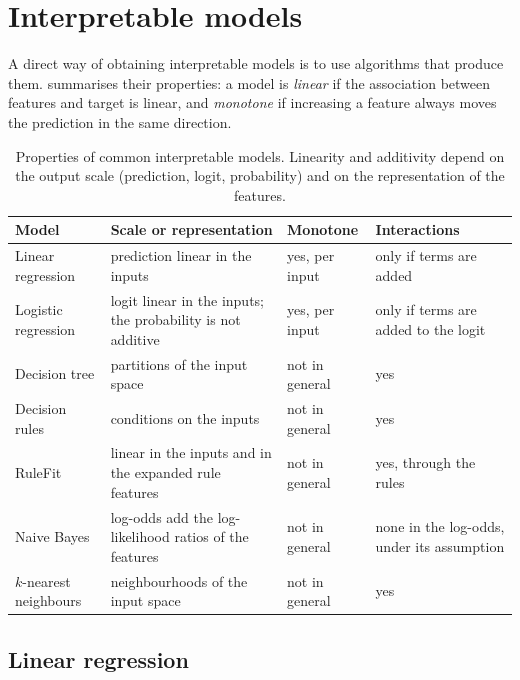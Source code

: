 \section{Interpretable models}\label{sec:intmodels}

A direct way of obtaining interpretable models is to use algorithms that produce
them.  summarises their properties: a model is \emph{linear} if the
association between features and target is linear, and \emph{monotone} if increasing a feature
always moves the prediction in the same direction.

\begin{table}[htbp]
\centering\small
\caption{Properties of common interpretable models. Linearity and additivity depend on the output scale
(prediction, logit, probability) and on the representation of the features.}\label{tab:intmodels}
\begin{tabularx}{\textwidth}{@{}l>{\raggedright\arraybackslash}X>{\raggedright\arraybackslash}p{2.7cm}>{\raggedright\arraybackslash}p{3.6cm}@{}}
\toprule
Model & Scale or representation & Monotone & Interactions\\
\midrule
Linear regression & prediction linear in the inputs & yes, per input & only if terms are added\\
Logistic regression & logit linear in the inputs; the probability is not additive & yes, per input & only if terms are added to the logit\\
Decision tree & partitions of the input space & not in general & yes\\
Decision rules & conditions on the inputs & not in general & yes\\
RuleFit & linear in the inputs and in the expanded rule features & not in general & yes, through the rules\\
Naive Bayes & log-odds add the log-likelihood ratios of the features & not in general & none in the log-odds, under its assumption\\
$k$-nearest neighbours & neighbourhoods of the input space & not in general & yes\\
\bottomrule
\end{tabularx}
\end{table}

\subsection{Linear regression}


